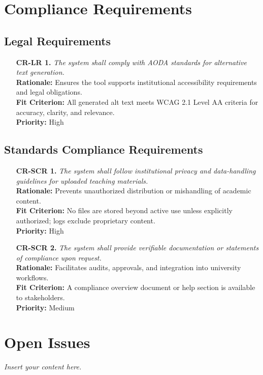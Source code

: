 \documentclass[12pt]{article}
\newcommand{\lips}{\textit{Insert your content here.}}
\begin{document}
\section{Compliance Requirements}
\subsection{Legal Requirements}
\begin{itemize}
  \item[\textbf{CR-LR 1.}] \textit{The system shall comply with AODA
    standards for alternative text generation.}\\
    \textbf{Rationale:} Ensures the tool supports institutional
    accessibility requirements and legal obligations.\\
    \textbf{Fit Criterion:} All generated alt text meets WCAG 2.1
    Level AA criteria for accuracy, clarity, and relevance.\\
    \textbf{Priority:} High
\end{itemize}
\subsection{Standards Compliance Requirements}
\begin{itemize}
  \item[\textbf{CR-SCR 1.}] \textit{The system shall follow
      institutional privacy and data-handling guidelines for uploaded
    teaching materials.}\\
    \textbf{Rationale:} Prevents unauthorized distribution or
    mishandling of academic content.\\
    \textbf{Fit Criterion:} No files are stored beyond active use
    unless explicitly authorized; logs exclude proprietary content.\\
    \textbf{Priority:} High

  \item[\textbf{CR-SCR 2.}] \textit{The system shall provide verifiable
    documentation or statements of compliance upon request.}\\
    \textbf{Rationale:} Facilitates audits, approvals, and
    integration into university workflows.\\
    \textbf{Fit Criterion:} A compliance overview document or help
    section is available to stakeholders.\\
    \textbf{Priority:} Medium
\end{itemize}

\section{Open Issues}
\lips
\end{document}
